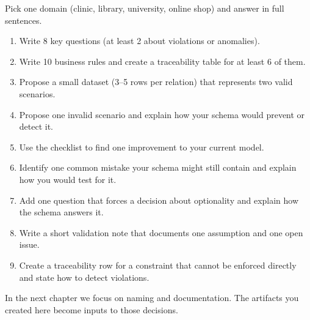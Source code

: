 \begin{exercisebox}
Pick one domain (clinic, library, university, online shop) and answer in full sentences.
\begin{enumerate}[label=\arabic*.]
  \item Write 8 key questions (at least 2 about violations or anomalies).
  \item Write 10 business rules and create a traceability table for at least 6 of them.
  \item Propose a small dataset (3--5 rows per relation) that represents two valid scenarios.
  \item Propose one invalid scenario and explain how your schema would prevent or detect it.
  \item Use the checklist to find one improvement to your current model.
  \item Identify one common mistake your schema might still contain and explain how you would test for it.
  \item Add one question that forces a decision about optionality and explain how the schema answers it.
  \item Write a short validation note that documents one assumption and one open issue.
  \item Create a traceability row for a constraint that cannot be enforced directly and state how to detect violations.
\end{enumerate}
\end{exercisebox}

In the next chapter we focus on naming and documentation.
The artifacts you created here become inputs to those decisions.
